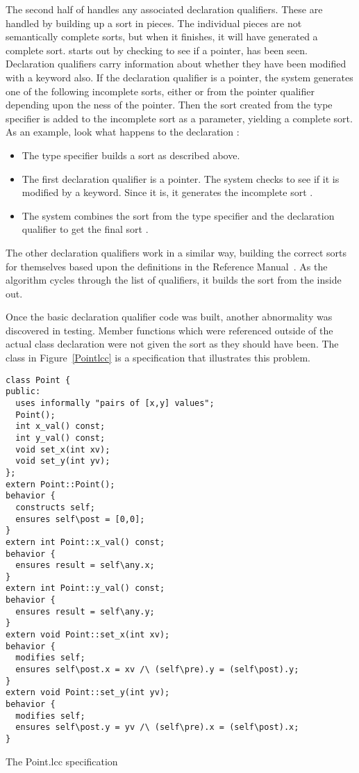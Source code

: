 The second half of  handles any associated
declaration qualifiers. These are handled by building up a sort in
pieces. The individual pieces are not semantically complete sorts, but 
when it finishes, it will have generated a complete sort.  starts out by checking to see if a pointer,
\reserved{*} has been seen. Declaration qualifiers carry
information about whether they have been modified with a
 keyword also. If the declaration qualifier is a pointer, the system
generates one of the following incomplete sorts, either  or  from
the pointer qualifier depending upon the ness of the
pointer. Then the sort created from the type
specifier is added to the incomplete sort as a parameter, yielding a
complete sort. As an example,
look what happens to the declaration :
\begin{itemize}
\item The type specifier builds a sort  as described
above.
\item The first declaration qualifier is a pointer. The system checks
to see if it is modified by a  keyword. Since it is,
it generates the incomplete sort .
\item The system combines the sort from the type specifier and the
declaration qualifier to get the final sort .
\end{itemize}

The other declaration qualifiers work in a similar way, building the
correct sorts for themselves based upon the definitions in the
Reference Manual~\cite{Leavens96c}. As the algorithm cycles through
the list of qualifiers, it builds the sort from the inside out.

Once the basic declaration qualifier code was built, another
abnormality was discovered in testing. Member functions which were
referenced outside of the actual class declaration were not given the
sort  as they should have been. The
class  in Figure~\ref{Pointlcc} is a specification
that illustrates this problem.
\begin{BFIGURE}
\begin{verbatim}
class Point {
public:
  uses informally "pairs of [x,y] values";
  Point();
  int x_val() const;
  int y_val() const;
  void set_x(int xv);
  void set_y(int yv);
};
extern Point::Point();
behavior {
  constructs self;
  ensures self\post = [0,0];
}
extern int Point::x_val() const;
behavior {
  ensures result = self\any.x;
}
extern int Point::y_val() const;
behavior {
  ensures result = self\any.y;
}
extern void Point::set_x(int xv);
behavior {
  modifies self;
  ensures self\post.x = xv /\ (self\pre).y = (self\post).y;
}
extern void Point::set_y(int yv);
behavior {
  modifies self;
  ensures self\post.y = yv /\ (self\pre).x = (self\post).x;
}
\end{verbatim}
\caption{The Point.lcc specification}
\label{Pointlcc}
\end{BFIGURE}

